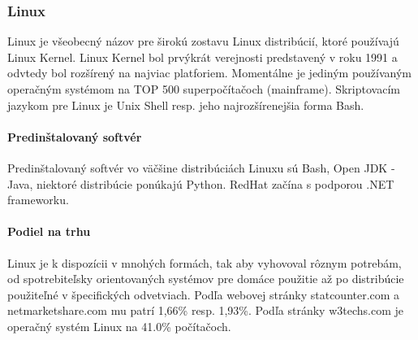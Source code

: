 \subsubsection{Linux}
\indent  Linux je všeobecný názov pre širokú zostavu Linux distribúcií, ktoré používajú Linux Kernel. Linux Kernel bol prvýkrát verejnosti predstavený v roku 1991 a odvtedy bol rozšírený na najviac platforiem. Momentálne je jediným používaným operačným systémom na TOP 500 superpočítačoch (mainframe). Skriptovacím jazykom pre Linux je Unix Shell resp. jeho najrozšírenejšia forma Bash.
\paragraph{Predinštalovaný softvér}
\indent Predinštalovaný softvér vo väčšine distribúciách Linuxu sú Bash, Open JDK - Java, niektoré distribúcie ponúkajú Python. RedHat začína s podporou .NET frameworku.
\paragraph{Podiel na trhu}
\indent Linux je k dispozícii v mnohých formách, tak aby vyhovoval rôznym potrebám, od spotrebiteľsky orientovaných systémov pre domáce použitie až po distribúcie použiteľné v špecifických odvetviach. Podľa webovej stránky statcounter.com\cite{statcounter} a netmarketshare.com\cite{netmarketshare} mu patrí 1,66\% resp.  1,93\%.
Podľa stránky w3techs.com\cite{pop} je operačný systém Linux na 41.0\% počítačoch.
